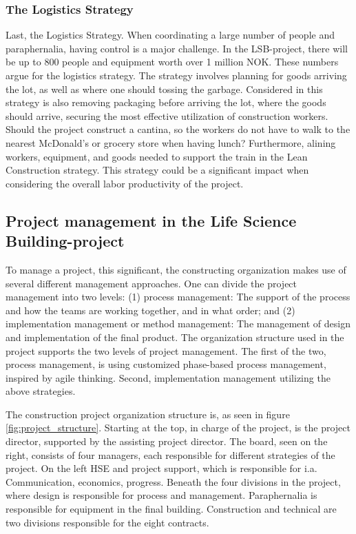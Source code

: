 \subsubsection*{The Logistics Strategy}
Last, the Logistics Strategy. When coordinating a large number of people and paraphernalia, having control is a major challenge. In the LSB-project, there will be up to 800 people and equipment worth over 1 million NOK.  These numbers argue for the logistics strategy. The strategy involves planning for goods arriving the lot, as well as where one should tossing the garbage. Considered in this strategy is also removing packaging before arriving the lot, where the goods should arrive, securing the most effective utilization of construction workers. Should the project construct a cantina, so the workers do not have to walk to the nearest McDonald's or grocery store when having lunch? Furthermore, alining workers, equipment, and goods needed to support the train in the Lean Construction strategy. This strategy could be a significant impact when considering the overall labor productivity of the project. 


\subsection*{Project management in the Life Science Building-project}
To manage a project, this significant, the constructing organization makes use of several different management approaches. One can divide the project management into two levels: (1) process management: The support of the process and how the teams are working together, and in what order; and (2) implementation management or method management: The management of design and implementation of the final product. The organization structure used in the project supports the two levels of project management. The first of the two, process management, is using customized phase-based process management, inspired by agile thinking. Second, implementation management utilizing the above strategies. 

The construction project organization structure is, as seen in figure \ref{fig:project_structure}. Starting at the top, in charge of the project, is the project director, supported by the assisting project director. The board, seen on the right, consists of four managers, each responsible for different strategies of the project. On the left HSE and project support, which is responsible for i.a. Communication, economics, progress. Beneath the four divisions in the project, where design is responsible for process and management. Paraphernalia is responsible for equipment in the final building. Construction and technical are two divisions responsible for the eight contracts.


